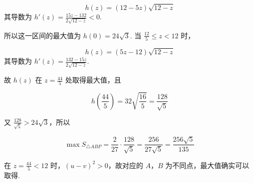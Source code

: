 \begin{solution}
\begin{enumerate}
\[
h(z)=(12-5z)\sqrt{12-z}
\]
其导数为 \(h'(z)=\frac{15z-132}{2\sqrt{12-z}}<0\).

所以这一区间的最大值为 \(h(0)=24\sqrt{3}\). 当 \(\frac{12}{5}\leqslant z<12\) 时，

\[
h(z)=(5z-12)\sqrt{12-z}
\]
其导数为 \(h'(z)=\frac{132-15z}{2\sqrt{12-z}}\).

故 \(h(z)\) 在 \(z=\frac{44}{5}\) 处取得最大值，且

\[
h\left(\frac{44}{5}\right)=32\sqrt{\frac{16}{5}}=\frac{128}{\sqrt{5}}
\]

又 \(\frac{128}{\sqrt{5}}>24\sqrt{3}\)，所以

\[
\max S_{\triangle ABP}=\frac{2}{27}\cdot\frac{128}{\sqrt{5}}=\frac{256}{27\sqrt{5}}=\frac{256\sqrt{5}}{135}
\]

在 \(z=\frac{44}{5}<12\) 时，\((u-v)^2>0\)，故对应的 \(A\)，\(B\) 为不同点，最大值确实可以取得.
\end{enumerate}
\end{solution}
